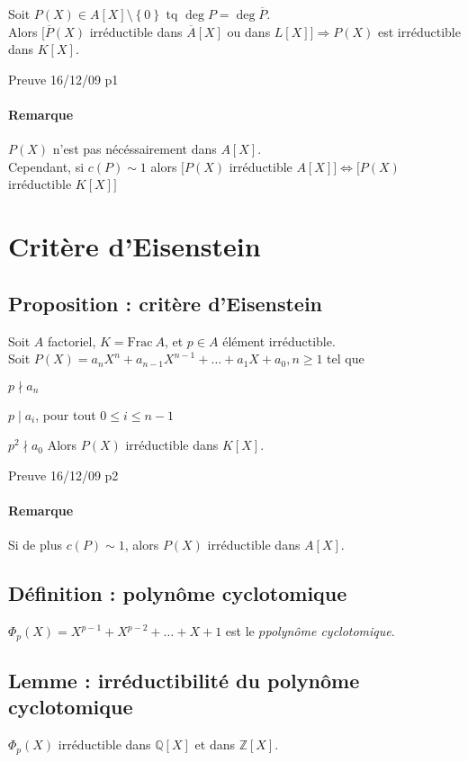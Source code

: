 \documentclass[reqno,a4paper,10pt]{report}
\makeatletter
\newcommand{\set}[1]{\left\lbrace #1 \right\rbrace} %
\newcommand{\Frac}{\mathrm{Frac}\:} %
\newcommand{\IZ}{\ensuremath{\mathbb{Z}}\xspace} %
\newcommand{\IQ}{\ensuremath{\mathbb{Q}}\xspace} %
\newcommand{\so}{\Rightarrow}
\let\oldenumerate=\enumerate%
\renewenvironment{enumerate}{%
    \oldenumerate%
  }{%
    \@noparlisttrue%
    \endlist%
  }%
\makeatother
\begin{document}
Soit $P(X)\in A[X]\setminus\set{0}$ tq $\deg P=\deg \overline P$.\\
Alors $\Big[\overline P(X)$ irréductible dans $\overline A[X]$ ou dans
$L[X]\Big]\so P(X)$ est irréductible dans $K[X]$.

  Preuve 16/12/09 p1

\paragraph{Remarque} $P(X)$ n'est pas nécéssairement dans $A[X]$.\\
Cependant, si $c(P)\sim 1$ alors $\Big[P(X)$ irréductible $A[X]\Big]
\iff \Big[P(X)$ irréductible $K[X]\Big]$

\section{Critère d'Eisenstein}
\subsection{Proposition : critère d'Eisenstein}
Soit $A$ factoriel, $K=\Frac A$, et $p \in A$ élément irréductible.\\
Soit $P(X)=a_n X^n + a_{n-1} X^{n-1}+\dots+a_1 X+a_0, n \geq 1$ tel que 
\begin{enumerate}[(i)]
  \item $p \nmid a_n$
  \item $p \mid a_i$, pour tout $0 \leq i \leq n-1$
  \item $p^2 \nmid a_0$
\end{enumerate}
Alors $P(X)$ irréductible dans $K[X]$.

  Preuve 16/12/09 p2

\paragraph{Remarque} Si de plus $c(P) \sim 1$, alors $P(X)$ irréductible dans
$A[X]$.

\subsection{Définition : polynôme cyclotomique}
$\Phi_p(X)=X^{p-1}+X^{p-2}+\dots+X+1$ est le $p$\ieme \emph{polynôme
cyclotomique}.

\subsection{Lemme : irréductibilité du polynôme cyclotomique}
$\Phi_p(X)$ irréductible dans $\IQ[X]$ et dans $\IZ[X]$.

\pagebreak
\end{document}
